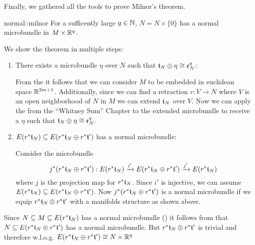 Finally, we gathered all the tools to prove Milnor's theorem.

\newcommand{\whitney} {
    r^*\bt_N \oplus{} r^*\bt'
}
\newcommand{\rtn} {
    r^*\bt_N
}

\begin{mytheorem}{normal::milnor}
    For a sufficently large $q \in \N$, $N = N \times \{0\}$ has a normal microbundle in $M \times \R^q$.
\end{mytheorem}

\begin{myproof}
    We show the theorem in multiple steps:
    \begin{enumerate}
        \item There exists a microbundle $\eta$ over $N$ such that $\bt_N \oplus \eta \cong \be[q]_N$:
        
        From the  it follows that we can consider $M$ to be embedded in euclidean space $\R^{2m + 1}$.
        Additionally, since we can find a retraction $r: V \to N$ where $V$ is an open neighborhood of $N$ in $M$ we can extend $\bt_N$ over $V$.
        Now we can apply the  from the ``Whitney Sum'' Chapter to the extended microbundle
        to receive a $\eta$ such that $\bt_N \oplus \eta \cong \be[q]_N$.

        \item $E(\rtn) \sub E(\whitney)$ has a normal microbundle:

        Consider the microbundle
        \[ \bundledef{j^*(\whitney)}{E(\rtn)}{E(\whitney)}{i'}{j'} \]
        where $j$ is the projection map for $\rtn$.
        Since $i'$ is injective, we can assume $E(\rtn) \sub E(\whitney)$.
        Now $j^*(\whitney)$ is a normal microbundle if we equip $\whitney$ with a manifolds structure as shown above.
    \end{enumerate}
    Since $N \sub M \sub E(\rtn)$ has a normal microbundle () it follows from  that $N \sub E(r^*\bt_N \oplus r^*\bt')$ has a normal microbundle.
    But $r^*\bt_N \oplus r^*\bt'$ is trivial and therefore w.l.o.g. $E(\whitney) \cong N \times \R^q$
\end{myproof}